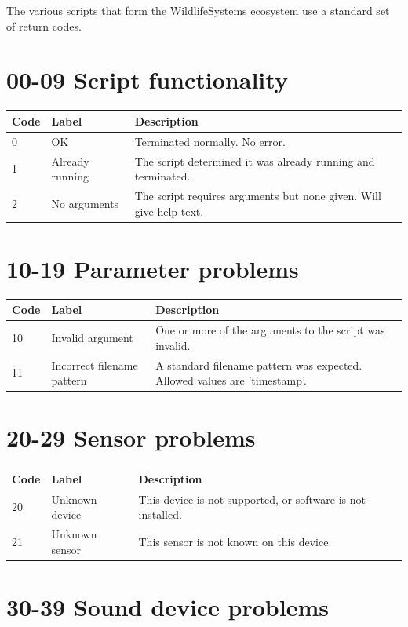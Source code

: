 \documentclass[
]{book}
\begin{document}
The various scripts that form the WildlifeSystems ecosystem use a standard set of return codes.

\section{00-09 Script functionality}\label{script-functionality}

\begin{tabular}{l|l|l}
\hline
Code & Label & Description\\
\hline
0 & OK & Terminated normally. No error.\\
\hline
1 & Already running & The script determined it was already running and terminated.\\
\hline
2 & No arguments & The script requires arguments but none given. Will give help text.\\
\hline
\end{tabular}

\section{10-19 Parameter problems}\label{parameter-problems}

\begin{tabular}{l|l|l}
\hline
Code & Label & Description\\
\hline
10 & Invalid argument & One or more of the arguments to the script was invalid.\\
\hline
11 & Incorrect filename pattern & A standard filename pattern was expected. Allowed values are 'timestamp'.\\
\hline
\end{tabular}

\section{20-29 Sensor problems}\label{sensor-problems}

\begin{tabular}{l|l|l}
\hline
Code & Label & Description\\
\hline
20 & Unknown device & This device is not supported, or software is not installed.\\
\hline
21 & Unknown sensor & This sensor is not known on this device.\\
\hline
\end{tabular}

\section{30-39 Sound device problems}\label{sound-device-problems}
\end{document}
